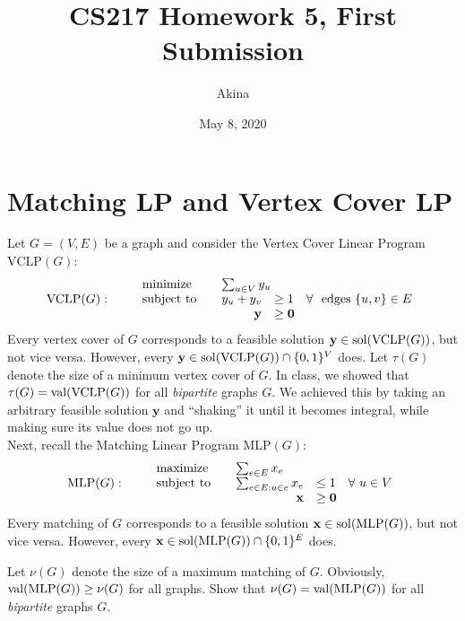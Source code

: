 \documentclass[11pt,a4paper,oneside]{article}
\newcommand{\x}{\mathbf{x}}
\newcommand{\y}{\mathbf{y}}
\newcommand{\sol}{\textup{\textrm{sol}}}
\newcommand{\val}{\textnormal{val}}
\renewcommand{\hwtitle} {CS217 Homework 5, First Submission}
\renewcommand{\hwauthor}{Akina}
\renewcommand{\hwdate}{May 8, 2020}
\begin{document}
\title{\hwtitle}
\author{\hwauthor}
\date{\hwdate}
\maketitle


\section*{Matching LP and Vertex Cover LP}



Let $G=(V,E)$ be a 
graph and consider the Vertex Cover Linear Program $\textrm{VCLP}(G)$:
\begin{align*}
\textrm{VCLP($G$)}: \qquad
\begin{array}{lrl}
\textnormal{minimize} \quad & \multicolumn{2}{l}{\sum_{u \in V} y_u} \\
\textnormal{subject to} \quad & y_u + y_v  & \geq 1 \quad \forall\ \textnormal{ edges } \{u,v\} \in E\\
& \y & \geq \mathbf{0}  
\end{array}
\end{align*}
Every vertex cover of $G$ corresponds to a feasible solution $\y \in \sol(\textrm{VCLP}(G))$, but not 
vice versa. However, every $\y \in \sol(\textrm{VCLP}(G)) \cap \{0,1\}^V$ does.
Let $\tau(G)$ denote the size of a minimum vertex cover of $G$. In class, we showed that
$\tau(G) = \val(\textrm{VCLP}(G))$ for all {\em bipartite} graphs $G$. We achieved this by taking
an arbitrary feasible solution $\y$ and ``shaking'' it until it becomes integral, while making sure
its value does not go up.\\


Next, recall the Matching Linear Program $\textrm{MLP}(G)$:
\begin{align*}
\textrm{MLP($G$)}: \qquad
\begin{array}{lrl}
\textnormal{maximize} \quad & \multicolumn{2}{l}{\sum_{e \in E} x_e} \\
\textnormal{subject to} \quad & \sum_{e \in E: u \in e} x_e  & \leq 1 \quad \forall\ u \in V \\
& \x & \geq \mathbf{0}  
\end{array}
\end{align*}
Every matching of $G$ corresponds to a feasible solution $\x \in \sol(\textrm{MLP}(G))$, but not 
vice versa. However, every $\x \in \sol(\textrm{MLP}(G)) \cap \{0,1\}^E$ does.

\begin{problem}{1}
	\statement
   Let $\nu(G)$ denote the size of a maximum matching of $G$. 
   Obviously, $ \val(\textrm{MLP}(G)) \geq \nu(G)$ for all graphs.
   Show that
   $\nu(G) = \val(\textrm{MLP}(G))$ for all {\em bipartite} graphs $G$.
   
    \solution
    
\end{problem}
\end{document}
